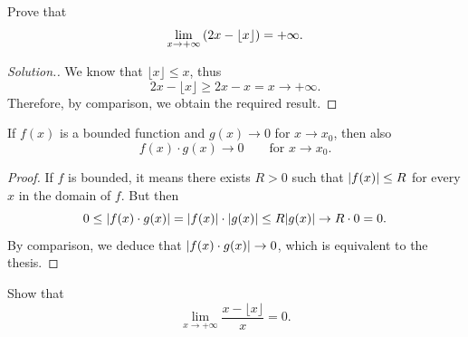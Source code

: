 \begin{example}
  Prove that 
  \[
    \lim_{x\to +\infty} {\left( 2x - \lfloor x\rfloor \right)} = +\infty. 
  \]
\end{example}
\begin{proof}[Solution.]
  We know that $\lfloor x\rfloor \le x$, thus 
  \[
    2x - \lfloor x \rfloor \ge 2x -x = x \to +\infty.  
  \]
  Therefore, by comparison, we obtain the required result.
\end{proof}

\begin{corollary}%
\label{cor:limitata_per_infinitesima}%
\mymark{**}%
  If $f(x)$ is a bounded function and $g(x)\to 0$ for 
  $x\to x_0$, then also
  \[
    f(x)\cdot g(x) \to 0 \qquad \text{for $x\to x_0.$} 
  \]
\end{corollary}
%
\begin{proof}
  If $f$ is bounded, it means there exists $R>0$ such that ${\left|f(x)\right|}\le R$
  for every $x$ in the domain of $f$.
  But then 
  \[
     0\le {\left|f(x)\cdot g(x)\right|} = {\left|f(x)\right|}\cdot {\left|g(x)\right|} 
     \le R {\left|g(x)\right|} \to R\cdot 0 = 0.
  \]
  By comparison, we deduce that ${\left|f(x)\cdot g(x)\right|}\to 0$, 
  which is equivalent to the thesis.
\end{proof}

\begin{exercise}
  Show that 
  \[
   \lim_{x\to +\infty} \frac{x-\lfloor x \rfloor}{x} = 0.  
  \]
\end{exercise}
%